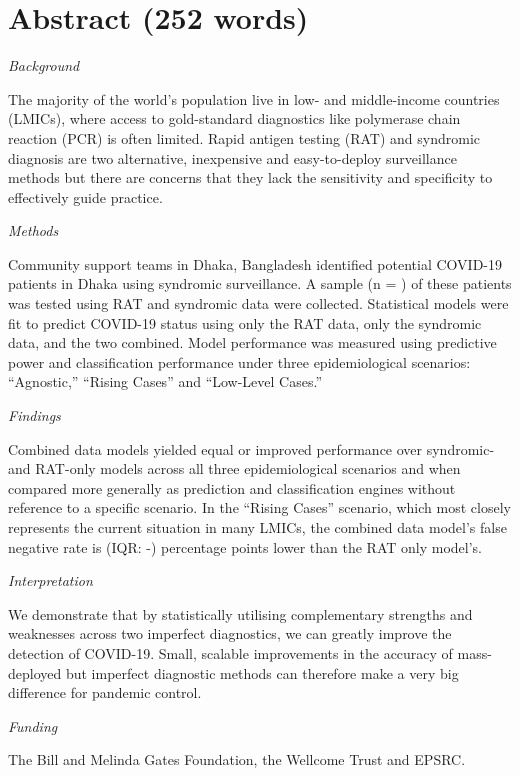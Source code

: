 \documentclass[]{elsarticle} %
\begin{document}
\hypertarget{abstract-252-words}{%
\section{Abstract (252 words)}\label{abstract-252-words}}

\emph{Background}

The majority of the world's population live in low- and middle-income countries (LMICs), where access to gold-standard diagnostics like polymerase chain reaction (PCR) is often limited.
Rapid antigen testing (RAT) and syndromic diagnosis are two alternative, inexpensive and easy-to-deploy surveillance methods but there are concerns that they lack the sensitivity and specificity to effectively guide practice.

\emph{Methods}

Community support teams in Dhaka, Bangladesh identified potential COVID-19 patients in Dhaka using syndromic surveillance.
A sample (n = ) of these patients was tested using RAT and syndromic data were collected.
Statistical models were fit to predict COVID-19 status using only the RAT data, only the syndromic data, and the two combined.
Model performance was measured using predictive power and classification performance under three epidemiological scenarios: ``Agnostic,'' ``Rising Cases'' and ``Low-Level Cases.''

\emph{Findings}

Combined data models yielded equal or improved performance over syndromic- and RAT-only models across all three epidemiological scenarios and when compared more generally as prediction and classification engines without reference to a specific scenario.
In the ``Rising Cases'' scenario, which most closely represents the current situation in many LMICs, the combined data model's false negative rate is  (IQR: -) percentage points lower than the RAT only model's.

\emph{Interpretation}

We demonstrate that by statistically utilising complementary strengths and weaknesses across two imperfect diagnostics, we can greatly improve the detection of COVID-19.
Small, scalable improvements in the accuracy of mass-deployed but imperfect diagnostic methods can therefore make a very big difference for pandemic control.

\emph{Funding}

The Bill and Melinda Gates Foundation, the Wellcome Trust and EPSRC.
\end{document}
